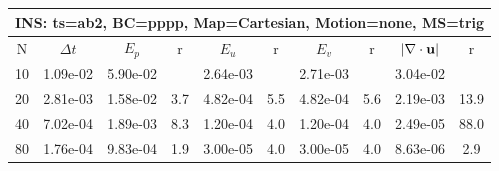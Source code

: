 
\begin{tabular}{|c|c|c|c|c|c|c|c|c|c|} \hline
 \multicolumn{10}{|c|}{INS: ts=ab2, BC=pppp, Map=Cartesian, Motion=none, MS=trig } \\ \hline 
     N  &   $\Delta t$ & $E_p$   &  r  &   $E_u$   &   r    &   $E_v$   & r   &  $|\nabla\cdot\mathbf{ u}|$  & r   \\ \hline 
  10   &  1.09e-02  &   5.90e-02  &        &   2.64e-03  &        &   2.71e-03  &        &   3.04e-02  &        \\ 
  20   &  2.81e-03  &   1.58e-02  & 3.7  &   4.82e-04  & 5.5  &   4.82e-04  & 5.6  &   2.19e-03  & 13.9  \\ 
  40   &  7.02e-04  &   1.89e-03  & 8.3  &   1.20e-04  & 4.0  &   1.20e-04  & 4.0  &   2.49e-05  & 88.0  \\ 
  80   &  1.76e-04  &   9.83e-04  & 1.9  &   3.00e-05  & 4.0  &   3.00e-05  & 4.0  &   8.63e-06  & 2.9  \\ 
 \hline 
\end{tabular}
